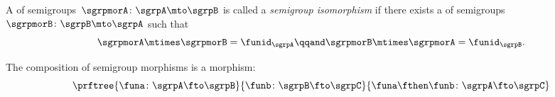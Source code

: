 \begin{ctdefinition}
  \label{def:semigroup-iso}
  A \whomo of semigroups~$\sgrpmorA\colon \sgrpA \mto \sgrpB$ is called a \emph{semigroup isomorphism} if there exists a \whomo of semigroups~$\sgrpmorB\colon \sgrpB \mto \sgrpA$ such that
  \begin{equation}
    \label{eq:sgrp-iso-cond}
    \sgrpmorA \mtimes \sgrpmorB = \funid_\sgrpA  \qqand \sgrpmorB \mtimes \sgrpmorA = \funid_\sgrpB.
  \end{equation}
\end{ctdefinition}

\begin{lemma}
  \label{lem:semigroup-morphisms-compose}
  The composition of semigroup morphisms is a morphism:
  \begin{equation}
    \label{eq:sgrp-mor-compo}
    \prftree{\funa  \colon \sgrpA \fto \sgrpB}{\funb \colon  \sgrpB \fto \sgrpC}{
      \funa \fthen \funb  \colon \sgrpA \fto \sgrpC}
  \end{equation}
\end{lemma}


